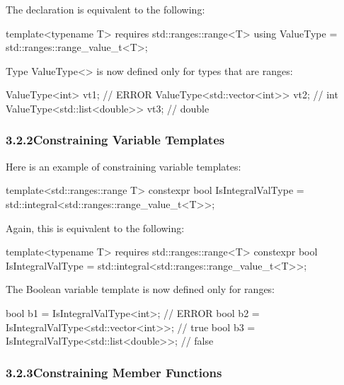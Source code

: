 The declaration is equivalent to the following:

\begin{cpp}
template<typename T>
requires std::ranges::range<T>
using ValueType = std::ranges::range_value_t<T>;
\end{cpp}

Type ValueType<> is now defined only for types that are ranges:

\begin{cpp}
ValueType<int> vt1; // ERROR
ValueType<std::vector<int>> vt2; // int
ValueType<std::list<double>> vt3; // double
\end{cpp}

\subsubsection*{ 3.2.2\hspace{0.2cm}Constraining Variable Templates}

Here is an example of constraining variable templates:

\begin{cpp}
template<std::ranges::range T>
constexpr bool IsIntegralValType = std::integral<std::ranges::range_value_t<T>>;
\end{cpp}

Again, this is equivalent to the following:

\begin{cpp}
template<typename T>
requires std::ranges::range<T>
constexpr bool IsIntegralValType = std::integral<std::ranges::range_value_t<T>>;
\end{cpp}

The Boolean variable template is now defined only for ranges:

\begin{cpp}
bool b1 = IsIntegralValType<int>; // ERROR
bool b2 = IsIntegralValType<std::vector<int>>; // true
bool b3 = IsIntegralValType<std::list<double>>; // false
\end{cpp}


\subsubsection*{ 3.2.3\hspace{0.2cm}Constraining Member Functions}

